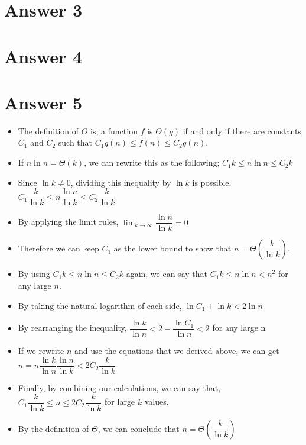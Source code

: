 \documentclass[12pt]{article}
\begin{document}
\begin{itemize}
\begin{enumerate}
    \end{enumerate}
    
\end{itemize}

\section*{Answer 3}

\section*{Answer 4}

\section*{Answer 5}
\begin{itemize}
    \item The definition of $\Theta$ is, a function $f$ is $\Theta(g)$ if and only if there are constants $C_1$ and $C_2$ such that $C_1g(n) \leq f(n) \leq C_2g(n)$.
    \item If $n \ln n=\Theta(k)$, we can rewrite this as the following;
    \subitem  $C_1 k \leq n \ln n \leq C_2 k$
    \item Since $\ln k \neq 0$, dividing this inequality by $\ln k$ is possible.
    \subitem $C_1 \dfrac{k}{\ln k} \leq n \dfrac{\ln n}{\ln k} \leq C_2 \dfrac{k}{\ln k}$
    \item By applying the limit rules,
    \subitem $\lim_{k\to\infty} \dfrac{\ln n}{\ln k} = 0$
    \item Therefore we can keep $C_1$ as the lower bound to show that $n=\Theta (\dfrac{k}{\ln k})$.
    \item By using $C_1 k \leq n \ln n \leq C_2 k$ again, we can say that 
    \subitem $C_1 k \leq n \ln n < n^2 $ for any large $n$. 
    \item By taking the natural logarithm of each side,
    \subitem $\ln C_1 + \ln k  < 2 \ln n $
    \item By rearranging the inequality,
    \subitem $\dfrac{\ln k}{\ln n} < 2 - \dfrac{\ln C_1}{\ln n} < 2 $ for any large n
    \item If we rewrite $n$ and use the equations that we derived above, we can get
    \subitem $n=n \dfrac{\ln k}{\ln n}\dfrac{\ln n}{\ln k} < 2 C_2 \dfrac{k}{\ln k}$
    \item Finally, by combining our calculations, we can say that,
    \subitem $C_1 \dfrac{k}{\ln k} \leq n \leq 2 C_2 \dfrac{k}{\ln k}$ for large $k$ values.
    \item By the definition of $\Theta$, we can conclude that $n= \Theta (\dfrac{k}{\ln k})$
    
    
    
    
\end{itemize}
\end{document}
